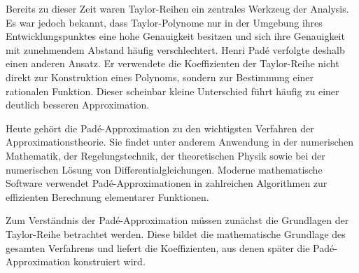 Bereits zu dieser Zeit waren Taylor-Reihen ein zentrales Werkzeug der Analysis. Es war jedoch bekannt, dass Taylor-Polynome nur in der Umgebung ihres Entwicklungspunktes eine hohe Genauigkeit besitzen und sich ihre Genauigkeit mit zunehmendem Abstand häufig verschlechtert. Henri Padé verfolgte deshalb einen anderen Ansatz. Er verwendete die Koeffizienten der Taylor-Reihe nicht direkt zur Konstruktion eines Polynoms, sondern zur Bestimmung einer rationalen Funktion. Dieser scheinbar kleine Unterschied führt häufig zu einer deutlich besseren Approximation.

Heute gehört die Padé-Approximation zu den wichtigsten Verfahren der Approximationstheorie. Sie findet unter anderem Anwendung in der numerischen Mathematik, der Regelungstechnik, der theoretischen Physik sowie bei der numerischen Lösung von Differentialgleichungen. Moderne mathematische Software verwendet Padé-Approximationen in zahlreichen Algorithmen zur effizienten Berechnung elementarer Funktionen.

Zum Verständnis der Padé-Approximation müssen zunächst die Grundlagen der Taylor-Reihe betrachtet werden. Diese bildet die mathematische Grundlage des gesamten Verfahrens und liefert die Koeffizienten, aus denen später die Padé-Approximation konstruiert wird.
